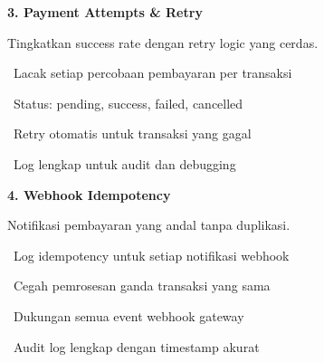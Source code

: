\documentclass[a4paper]{article}
\begin{document}
\vspace{8pt}

\noindent
\begin{minipage}[t]{0.485\textwidth}
    \colorbox{TealPrimary}{%
        \begin{minipage}{\dimexpr\textwidth-14pt}
            \vspace{5pt}
            {\fontsize{10}{13}\selectfont\bfseries\color{White} 3. Payment Attempts \& Retry}
            \vspace{5pt}
        \end{minipage}}
    \vspace{5pt}
    {\fontsize{9}{12}\selectfont\color{TextDark}%
    Tingkatkan success rate dengan retry logic yang cerdas.\par\vspace{3pt}
    \textbullet\ Lacak setiap percobaan pembayaran per transaksi\par\vspace{2pt}%
    \textbullet\ Status: pending, success, failed, cancelled\par\vspace{2pt}%
    \textbullet\ Retry otomatis untuk transaksi yang gagal\par\vspace{2pt}%
    \textbullet\ Log lengkap untuk audit dan debugging}%
\end{minipage}%
\hfill
\begin{minipage}[t]{0.485\textwidth}
    \colorbox{PurplePrimary}{%
        \begin{minipage}{\dimexpr\textwidth-14pt}
            \vspace{5pt}
            {\fontsize{10}{13}\selectfont\bfseries\color{White} 4. Webhook Idempotency}
            \vspace{5pt}
        \end{minipage}}
    \vspace{5pt}
    {\fontsize{9}{12}\selectfont\color{TextDark}%
    Notifikasi pembayaran yang andal tanpa duplikasi.\par\vspace{3pt}
    \textbullet\ Log idempotency untuk setiap notifikasi webhook\par\vspace{2pt}%
    \textbullet\ Cegah pemrosesan ganda transaksi yang sama\par\vspace{2pt}%
    \textbullet\ Dukungan semua event webhook gateway\par\vspace{2pt}%
    \textbullet\ Audit log lengkap dengan timestamp akurat}%
\end{minipage}
\end{document}

